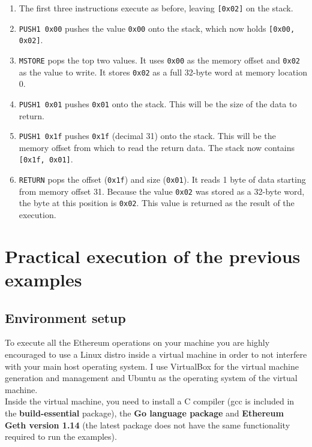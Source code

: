\documentclass{scrbook}
\begin{document}
\begin{enumerate}
    \item The first three instructions execute as before, leaving \texttt{[0x02]} on the stack.
    \item \texttt{PUSH1 0x00} pushes the value \texttt{0x00} onto the stack, which now holds \texttt{[0x00, 0x02]}.
    \item \texttt{MSTORE} pops the top two values. It uses \texttt{0x00} as the memory offset and \texttt{0x02} as the value to write. It stores \texttt{0x02} as a full 32-byte word at memory location 0.
    \item \texttt{PUSH1 0x01} pushes \texttt{0x01} onto the stack. This will be the size of the data to return.
    \item \texttt{PUSH1 0x1f} pushes \texttt{0x1f} (decimal 31) onto the stack. This will be the memory offset from which to read the return data. The stack now contains \texttt{[0x1f, 0x01]}.
    \item \texttt{RETURN} pops the offset (\texttt{0x1f}) and size (\texttt{0x01}). It reads 1 byte of data starting from memory offset 31. Because the value \texttt{0x02} was stored as a 32-byte word, the byte at this position is \texttt{0x02}. This value is returned as the result of the execution.
\end{enumerate}

\section{Practical execution of the previous examples}

\subsection{Environment setup}

To execute all the Ethereum operations on your machine you are highly encouraged to use a Linux distro inside a virtual machine in order to not interfere with your main host operating system. I use VirtualBox for the virtual machine generation and management and Ubuntu as the operating system of the virtual machine.\\

Inside the virtual machine, you need to install a C compiler (gcc is included in the \textbf{build-essential} package), the \textbf{Go language package} and \textbf{Ethereum Geth version 1.14} (the latest package does not have the same functionality required to run the examples).\\
\end{document}
